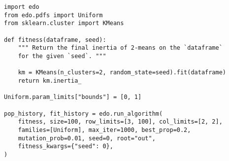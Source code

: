 \documentclass[11pt]{article}
\begin{document}
\begin{lstlisting}
import edo
from edo.pdfs import Uniform
from sklearn.cluster import KMeans

def fitness(dataframe, seed):
    """ Return the final inertia of 2-means on the `dataframe`
    for the given `seed`. """

    km = KMeans(n_clusters=2, random_state=seed).fit(dataframe)
    return km.inertia_

Uniform.param_limits["bounds"] = [0, 1]

pop_history, fit_history = edo.run_algorithm(
    fitness, size=100, row_limits=[3, 100], col_limits=[2, 2],
    families=[Uniform], max_iter=1000, best_prop=0.2,
    mutation_prob=0.01, seed=0, root="out",
    fitness_kwargs={"seed": 0},
)
\end{lstlisting}
\end{document}
